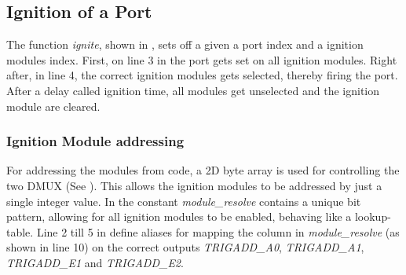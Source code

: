
\pagebreak

\subsection{Ignition of a Port}




\noindent The function \textit{ignite}, shown in , sets off a given a port index and a ignition modules index. First, on line 3 in  the port gets set on all ignition modules. Right after, in line 4, the correct ignition modules gets selected, thereby firing the port. After a delay called ignition time, all modules get unselected and the ignition module are cleared.\\

\subsubsection{Ignition Module addressing}
\label{Ignition Module addressing}



\noindent For addressing the modules from code, a 2D byte array is used for controlling the two DMUX (See ). This allows the ignition modules to be addressed by just a single integer value.  In  the constant \textit{module\_resolve} contains a unique bit pattern, allowing for all ignition modules to be enabled, behaving like a lookup-table. Line 2 till 5 in  define aliases for mapping the column in \textit{module\_resolve} (as shown in line 10) on the correct outputs \textit{TRIGADD\_A0}, \textit{TRIGADD\_A1}, \textit{TRIGADD\_E1}  and \textit{TRIGADD\_E2}. 




